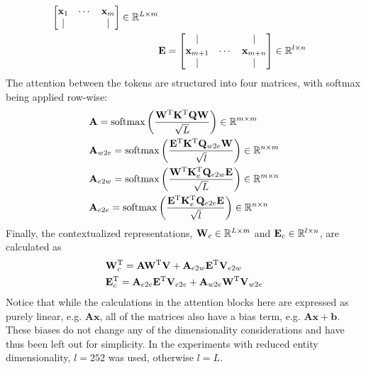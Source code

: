 \documentclass[10pt, a4paper]{article}
\newcommand{\softmax}{\operatorname{softmax}}
\begin{document}
{\begin{align*}
\begin{bmatrix}
        \mathbf x_1&\cdots&\mathbf x_m\\
        |&&|
    \end{bmatrix} \in \mathbb R^{L\times m}\\
    &\mathbf E = \begin{bmatrix}
        |&&|\\
        \mathbf x_{m+1}&\cdots&\mathbf x_{m+n}\\
        |&&|
    \end{bmatrix} \in \mathbb R^{l\times n}
\end{align*}
The attention between the tokens are structured into four matrices, with softmax being applied row-wise:
\begin{align*}
        &\mathbf A = \softmax\left(\frac{\transpose{\mathbf W}\transpose{\mathbf K}\mathbf Q\mathbf W}{\sqrt{L}}\right)\in\RR^{m\times m}\\
        &\mathbf A_{w2e} = \softmax\left(\frac{\transpose{\mathbf E}\transpose{\mathbf K}\mathbf Q_{w2e}\mathbf W}{\sqrt{l}}\right)\in\RR^{n\times m}\\
        &\mathbf A_{e2w} = \softmax\left(\frac{\transpose{\mathbf W}\transpose{\mathbf K_e}\mathbf Q_{e2w}\mathbf E}{\sqrt{L}}\right)\in\RR^{m\times n}\\
        &\mathbf A_{e2e} = \softmax\left(\frac{\transpose{\mathbf E}\transpose{\mathbf K_e}\mathbf Q_{e2e}\mathbf E}{\sqrt{l}}\right)\in\RR^{n\times n}
\end{align*}
Finally, the contextualized representations, $ \mathbf W_{c}\in\mathbb R^{L\times m} $ and $ \mathbf E_{c}\in\mathbb R^{l\times n} $, are calculated as
\begin{align*}
    &\mathbf W_c^{\textup T} = \mathbf A\mathbf W^{\textup T}\mathbf V
        + \mathbf A_{e2w}\mathbf E^{\textup T}\mathbf V_{e2w} \\
        &\mathbf E_c^{\textup T} = \mathbf A_{e2e}\mathbf E^{\textup T}\mathbf V_{e2e}
        + \mathbf A_{w2e}\mathbf W^{\textup T}\mathbf V_{w2e}
\end{align*}
Notice that while the calculations in the attention blocks here are expressed as purely linear, e.g. $ \mathbf A\mathbf x $, all of the matrices also have a bias term, e.g. $ \mathbf A\mathbf x+\mathbf b $.
These biases do not change any of the dimensionality considerations and have thus been left out for simplicity.
In the experiments with reduced entity dimensionality, $l=252$ was used, otherwise $l=L$.

}
\end{document}

